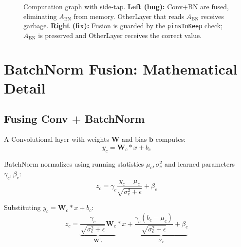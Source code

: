 \documentclass[12pt]{article}
\theoremstyle{definition}
\begin{document}
\begin{figure}[h!]
\caption{Computation graph with side-tap. \textbf{Left (bug):} Conv+BN are fused, eliminating $A_{\text{BN}}$ from memory. OtherLayer that reads $A_{\text{BN}}$ receives garbage. \textbf{Right (fix):} Fusion is guarded by the \texttt{pinsToKeep} check; $A_{\text{BN}}$ is preserved and OtherLayer receives the correct value.}
\label{fig:fusion}
\end{figure}

\section{BatchNorm Fusion: Mathematical Detail}

\subsection{Fusing Conv + BatchNorm}

A Convolutional layer with weights $\mathbf{W}$ and bias $\mathbf{b}$ computes:
\begin{equation}
y_c = \mathbf{W}_c * x + b_c
\end{equation}

BatchNorm normalizes using running statistics $\mu_c, \sigma_c^2$ and learned parameters $\gamma_c, \beta_c$:
\begin{equation}
z_c = \gamma_c \frac{y_c - \mu_c}{\sqrt{\sigma_c^2 + \epsilon}} + \beta_c
\end{equation}

Substituting $y_c = \mathbf{W}_c * x + b_c$:
\begin{equation}
z_c = \underbrace{\frac{\gamma_c}{\sqrt{\sigma_c^2 + \epsilon}} \mathbf{W}_c}_{\mathbf{W}'_c} * x + \underbrace{\frac{\gamma_c (b_c - \mu_c)}{\sqrt{\sigma_c^2 + \epsilon}} + \beta_c}_{b'_c}
\end{equation}
\end{document}
